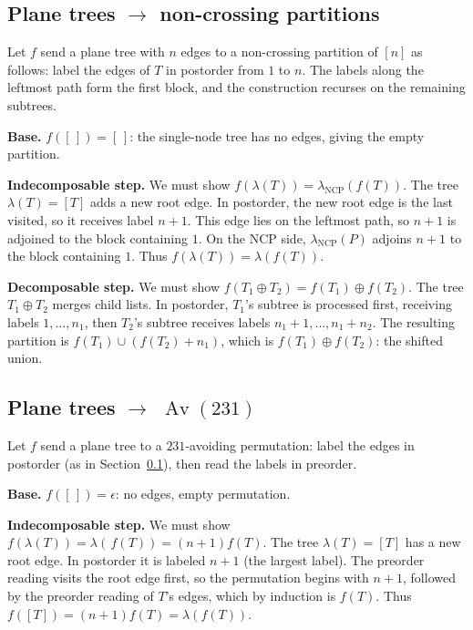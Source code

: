 \documentclass[a4paper,11pt]{article}
\theoremstyle{definition}
\DeclareMathOperator{\Av}{Av}
\begin{document}
\subsection{Plane trees $\to$ non-crossing
  partitions}\label{sec:bij-trees-ncp}

Let $f$ send a plane tree with $n$ edges to a
non-crossing partition of $[n]$ as follows: label the
edges of $T$ in postorder from $1$ to $n$. The labels
along the leftmost path form the first block, and the
construction recurses on the remaining subtrees.

\textbf{Base.}
$f([\,]) = [\,]$: the single-node tree has no edges,
giving the empty partition.

\textbf{Indecomposable step.}
We must show
$f(\lambda(T)) = \lambda_{\text{NCP}}(f(T))$.
The tree $\lambda(T) = [T]$ adds a new root edge. In
postorder, the new root edge is the last visited, so it
receives label $n{+}1$. This edge lies on the leftmost
path, so $n{+}1$ is adjoined to the block containing
$1$. On the NCP side, $\lambda_{\text{NCP}}(P)$ adjoins
$n{+}1$ to the block containing $1$. Thus
$f(\lambda(T)) = \lambda(f(T))$.

\textbf{Decomposable step.}
We must show
$f(T_1 \oplus T_2) = f(T_1) \oplus f(T_2)$.
The tree $T_1 \oplus T_2$ merges child lists. In
postorder, $T_1$'s subtree is processed first, receiving
labels $1, \ldots, n_1$, then $T_2$'s subtree receives
labels $n_1{+}1, \ldots, n_1{+}n_2$. The resulting
partition is $f(T_1) \cup (f(T_2) + n_1)$, which is
$f(T_1) \oplus f(T_2)$: the shifted union.

\subsection{Plane trees $\to$ $\Av(231)$}\label{sec:bij-trees-231}

Let $f$ send a plane tree to a $231$-avoiding
permutation: label the edges in postorder (as in
Section~\ref{sec:bij-trees-ncp}), then read the labels in
preorder.

\textbf{Base.}
$f([\,]) = \epsilon$: no edges, empty permutation.

\textbf{Indecomposable step.}
We must show
$f(\lambda(T)) = \lambda(\,f(T)) = (n{+}1) f(T)$.
The tree $\lambda(T) = [T]$ has a new root edge. In
postorder it is labeled $n{+}1$ (the largest label).
The preorder reading visits the root edge first, so the
permutation begins with $n{+}1$, followed by the
preorder reading of $T$'s edges, which by induction is
$f(T)$. Thus
$f([T]) = (n{+}1) f(T) = \lambda(f(T))$.
\end{document}
